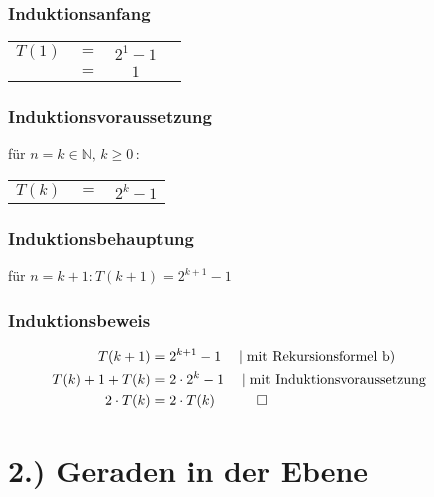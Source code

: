 \documentclass[titlepage]{article}
\begin{document}
			\subsubsection*{Induktionsanfang}
				\begin{tabular}{lccl}
					$T(1)$ & $=$ & $2^1-1$ & \\
					 & $=$ & $1$ & \\
				\end{tabular}
				
				\subsubsection*{Induktionsvoraussetzung}
				für $n=k \in \mathbb{N},\,k \ge 0 \, :$
				\begin{tabular}{lcc}
					$T(k)$ & $=$ & $2^k-1$ \\
				\end{tabular}
				\subsubsection*{Induktionsbehauptung}
				für $n=k+1 : T(k+1)=2^{k+1}-1$
				\subsubsection*{Induktionsbeweis}
				\begin{align*}
					T(k+1) &= 2^{k+1}-1\quad\mid\text{mit Rekursionsformel b)}&&&&&&\\
					T(k)+1+T(k) &= 2\cdot 2^k-1\quad\mid\text{mit Induktionsvoraussetzung}\\
					2\cdot T(k) &= 2\cdot T(k)\quad\qed
				\end{align*}
		\newpage
		
	\section*{2.) Geraden in der Ebene}
\end{document}
